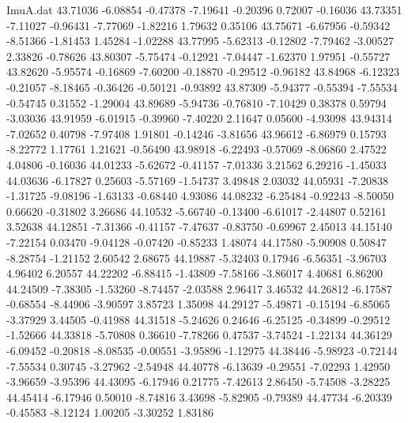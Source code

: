 \begin{filecontents}{ImuA.dat}
  43.71036   -6.08854   -0.47378   -7.19641   -0.20396    0.72007   -0.16036
  43.73351   -7.11027   -0.96431   -7.77069   -1.82216    1.79632    0.35106
  43.75671   -6.67956   -0.59342   -8.51366   -1.81453    1.45284   -1.02288
  43.77995   -5.62313   -0.12802   -7.79462   -3.00527    2.33826   -0.78626
  43.80307   -5.75474   -0.12921   -7.04447   -1.62370    1.97951   -0.55727
  43.82620   -5.95574   -0.16869   -7.60200   -0.18870   -0.29512   -0.96182
  43.84968   -6.12323   -0.21057   -8.18465   -0.36426   -0.50121   -0.93892
  43.87309   -5.94377   -0.55394   -7.55534   -0.54745    0.31552   -1.29004
  43.89689   -5.94736   -0.76810   -7.10429    0.38378    0.59794   -3.03036
  43.91959   -6.01915   -0.39960   -7.40220    2.11647    0.05600   -4.93098
  43.94314   -7.02652    0.40798   -7.97408    1.91801   -0.14246   -3.81656
  43.96612   -6.86979    0.15793   -8.22772    1.17761    1.21621   -0.56490
  43.98918   -6.22493   -0.57069   -8.06860    2.47522    4.04806   -0.16036
  44.01233   -5.62672   -0.41157   -7.01336    3.21562    6.29216   -1.45033
  44.03636   -6.17827    0.25603   -5.57169   -1.54737    3.49848    2.03032
  44.05931   -7.20838   -1.31725   -9.08196   -1.63133   -0.68440    4.93086
  44.08232   -6.25484   -0.92243   -8.50050    0.66620   -0.31802    3.26686
  44.10532   -5.66740   -0.13400   -6.61017   -2.44807    0.52161    3.52638
  44.12851   -7.31366   -0.41157   -7.47637   -0.83750   -0.69967    2.45013
  44.15140   -7.22154    0.03470   -9.04128   -0.07420   -0.85233    1.48074
  44.17580   -5.90908    0.50847   -8.28754   -1.21152    2.60542    2.68675
  44.19887   -5.32403    0.17946   -6.56351   -3.96703    4.96402    6.20557
  44.22202   -6.88415   -1.43809   -7.58166   -3.86017    4.40681    6.86200
  44.24509   -7.38305   -1.53260   -8.74457   -2.03588    2.96417    3.46532
  44.26812   -6.17587   -0.68554   -8.44906   -3.90597    3.85723    1.35098
  44.29127   -5.49871   -0.15194   -6.85065   -3.37929    3.44505   -0.41988
  44.31518   -5.24626    0.24646   -6.25125   -0.34899   -0.29512   -1.52666
  44.33818   -5.70808    0.36610   -7.78266    0.47537   -3.74524   -1.22134
  44.36129   -6.09452   -0.20818   -8.08535   -0.00551   -3.95896   -1.12975
  44.38446   -5.98923   -0.72144   -7.55534    0.30745   -3.27962   -2.54948
  44.40778   -6.13639   -0.29551   -7.02293    1.42950   -3.96659   -3.95396
  44.43095   -6.17946    0.21775   -7.42613    2.86450   -5.74508   -3.28225
  44.45414   -6.17946    0.50010   -8.74816    3.43698   -5.82905   -0.79389
  44.47734   -6.20339   -0.45583   -8.12124    1.00205   -3.30252    1.83186

\end{filecontents}
